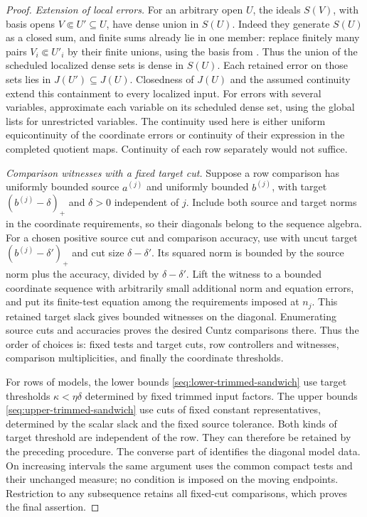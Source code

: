 \begin{proof}
\emph{Extension of local errors.}
For an arbitrary open \(U\), the ideals \(S(V)\), with basis
opens \(V\Subset U'\subseteq U\), have dense union in \(S(U)\).
Indeed they generate \(S(U)\) as a closed sum, and finite sums
already lie in one member: replace finitely many pairs
\(V_i\Subset U'_i\) by their finite unions, using the basis
from . Thus the union of the scheduled
localized dense sets is dense in \(S(U)\). Each retained error
on those sets lies in \(J(U')\subseteq J(U)\).
Closedness of \(J(U)\) and the assumed continuity extend this
containment to every localized input. For errors with several
variables, approximate each variable on its scheduled dense set,
using the global lists for unrestricted variables.
The continuity used here is either uniform equicontinuity of the
coordinate errors or continuity of their expression in the completed
quotient maps. Continuity of each row separately would not suffice.

\emph{Comparison witnesses with a fixed target cut.}
Suppose a row
comparison has uniformly bounded source \(a^{(j)}\) and uniformly
bounded \(b^{(j)}\), with target \((b^{(j)}-\delta)_+\) and
\(\delta>0\) independent of \(j\). Include both source and target
norms in the coordinate requirements, so their diagonals belong to
the sequence algebra.
For a chosen positive source cut and comparison accuracy, use
 with uncut target
\((b^{(j)}-\delta')_+\) and cut size \(\delta-\delta'\).
Its squared norm is bounded by the source norm plus the accuracy,
divided by \(\delta-\delta'\). Lift the witness to a
bounded coordinate sequence with arbitrarily small additional norm
and equation errors, and put its finite-test equation among the
requirements imposed at \(n_j\). This retained target slack gives
bounded witnesses on the diagonal. Enumerating source cuts and
accuracies proves the desired Cuntz comparisons there. Thus the
order of choices is: fixed tests and target cuts, row controllers
and witnesses, comparison multiplicities, and finally the coordinate
thresholds.

For rows of models, the lower bounds
\eqref{seq:lower-trimmed-sandwich} use target thresholds
\(\kappa<\eta\delta\) determined by fixed trimmed input factors.
The upper bounds \eqref{seq:upper-trimmed-sandwich} use cuts of fixed
constant representatives, determined by the scalar slack and the
fixed source tolerance. Both kinds of target threshold are
independent of the row. They can therefore be retained by the
preceding procedure. The converse part of 
identifies the diagonal model data. On increasing intervals the
same argument uses the common compact tests and their unchanged
measure; no condition is imposed on the moving endpoints.
Restriction to any subsequence retains all fixed-cut comparisons,
which proves the final assertion.
\end{proof}

